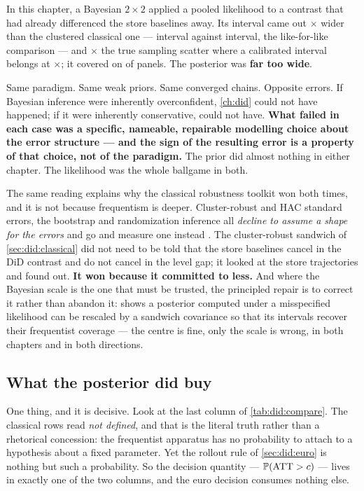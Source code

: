 In this chapter, a Bayesian $2 \times 2$ applied a pooled likelihood to a contrast that had already
differenced the store baselines away. Its interval came out \nbEightBayesOverCluster$\times$ wider
than the clustered classical one --- interval against interval, the like-for-like comparison ---
and \nbEightPooledOverScatter$\times$ the true sampling scatter where a calibrated interval belongs
at \nbEightCalibratedRatio$\times$; it covered on \nbEightSeedCov{} of \nbEightSeedN{} panels. The
posterior was \textbf{far too wide}.

Same paradigm. Same weak priors. Same converged chains. Opposite errors. If Bayesian inference were
inherently overconfident, \cref{ch:did} could not have happened; if it were inherently conservative,
 could not have. \textbf{What failed in each case was a specific, nameable, repairable
modelling choice about the error structure --- and the sign of the resulting error is a property of
that choice, not of the paradigm.} The prior did almost nothing in either chapter. The likelihood was
the whole ballgame in both.

The same reading explains why the classical robustness toolkit won both times, and it is not because
frequentism is deeper. Cluster-robust and HAC standard errors, the bootstrap and randomization
inference all \emph{decline to assume a shape for the errors} and go and measure one instead
\citep{liang1986, newey1987, bertrand2004, cameron2015}. The cluster-robust sandwich of
\cref{sec:did:classical} did not need to be told that the store baselines cancel in the DiD contrast
and do not cancel in the level gap; it looked at the \nbEightNStores{} store trajectories and found
out. \textbf{It won because it committed to less.} And where the Bayesian scale is the one that must
be trusted, the principled repair is to correct it rather than abandon it: \citet{mueller2013} shows
a posterior computed under a misspecified likelihood can be rescaled by a sandwich covariance so that
its intervals recover their frequentist coverage --- the centre is fine, only the scale is wrong,
in both chapters and in both directions.

\subsection*{What the posterior did buy}

One thing, and it is decisive. Look at the last column of \cref{tab:did:compare}. The classical rows
read \emph{not defined}, and that is the literal truth rather than a rhetorical concession: the
frequentist apparatus has no probability to attach to a hypothesis about a fixed parameter. Yet the
rollout rule of \cref{sec:did:euro} is nothing but such a probability. So the decision quantity ---
$\operatorname{\mathbb{P}}(\text{ATT} > c)$ --- lives in exactly one of the two columns, and the euro decision consumes
nothing else.

